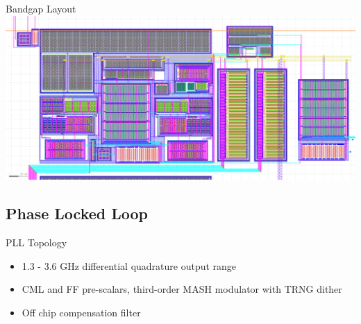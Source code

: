 \documentclass[10pt]{beamer}
\begin{document}
\begin{frame}{Bandgap Layout}
\includegraphics[scale=0.18]{bandgap_layout}
\end{frame}


\subsection{Phase Locked Loop}

\begin{frame}{PLL Topology}

\begin{figure}[h]
\end{figure}

\begin{itemize}
 \item 1.3 - 3.6 GHz differential quadrature output range
 \item CML and FF pre-scalars, third-order MASH modulator with TRNG dither
 \item Off chip compensation filter
\end{itemize}

\end{frame}
\end{document}
